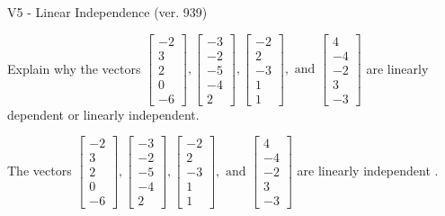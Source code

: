 \begin{exercise}
  \begin{exerciseTitle}V5 - Linear Independence (ver. 939)\end{exerciseTitle}
  \begin{exerciseStatement}
    Explain why the vectors \(\left[\begin{array}{r}
-2 \\
3 \\
2 \\
0 \\
-6
\end{array}\right] , \left[\begin{array}{r}
-3 \\
-2 \\
-5 \\
-4 \\
2
\end{array}\right] , \left[\begin{array}{r}
-2 \\
2 \\
-3 \\
1 \\
1
\end{array}\right] , \text{ and } \left[\begin{array}{r}
4 \\
-4 \\
-2 \\
3 \\
-3
\end{array}\right]\) are linearly dependent or linearly independent.	


  \end{exerciseStatement}
  \begin{exerciseAnswer}
   The vectors \(\left[\begin{array}{r}
-2 \\
3 \\
2 \\
0 \\
-6
\end{array}\right] , \left[\begin{array}{r}
-3 \\
-2 \\
-5 \\
-4 \\
2
\end{array}\right] , \left[\begin{array}{r}
-2 \\
2 \\
-3 \\
1 \\
1
\end{array}\right] , \text{ and } \left[\begin{array}{r}
4 \\
-4 \\
-2 \\
3 \\
-3
\end{array}\right]\) are 
  	 linearly independent  .
  


  \end{exerciseAnswer}
\end{exercise}